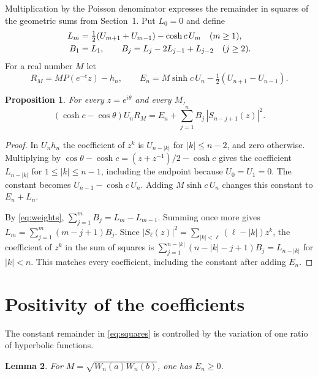 \documentclass[10pt,twoside,reqno]{amsart}
\newtheorem{proposition}{Proposition}[section]
\newtheorem{lemma}[proposition]{Lemma}
\numberwithin{equation}{section}
\begin{document}
Multiplication by the Poisson denominator expresses the remainder in squares
of the geometric sums from Section~1. Put \(L_0=0\) and define
\begin{align}
 L_m&=\tfrac12(U_{m+1}+U_{m-1})-\cosh c\,U_m \quad (m\ge1), \notag\\
 B_1&=L_1,\qquad B_j=L_j-2L_{j-1}+L_{j-2}\quad (j\ge2). \label{eq:weights}
\end{align}
For a real number \(M\) let
\[
 R_M=M P(e^{-c}z)-h_n,\qquad
 E_n=M\sinh c\,U_n-\tfrac12(U_{n+1}-U_{n-1}).
\]

\begin{proposition}\label{prop:squares}
For every \(z=e^{i\theta}\) and every \(M\),
\begin{equation}\tag{A}\label{eq:squares}
 (\cosh c-\cos\theta)U_n R_M
   =E_n+\sum_{j=1}^n B_j\,|S_{n-j+1}(z)|^2 .
\end{equation}
\end{proposition}

\begin{proof}
In \(U_n h_n\) the coefficient of \(z^k\) is \(U_{n-|k|}\) for
\(|k|\le n-2\), and zero otherwise. Multiplying by
\(\cos\theta-\cosh c=(z+z^{-1})/2-\cosh c\) gives the coefficient
\(L_{n-|k|}\) for \(1\le|k|\le n-1\), including the endpoint because
\(U_0=U_1=0\). The constant becomes \(U_{n-1}-\cosh c\,U_n\).
Adding \(M\sinh c\,U_n\) changes this constant to \(E_n+L_n\).

By \eqref{eq:weights}, \(\sum_{j=1}^m B_j=L_m-L_{m-1}\).
Summing once more gives
\(L_m=\sum_{j=1}^m(m-j+1)B_j\). Since
\(|S_\ell(z)|^2=\sum_{|k|<\ell}(\ell-|k|)z^k\),
the coefficient of \(z^k\) in the sum of squares is
\(\sum_{j=1}^{n-|k|}(n-|k|-j+1)B_j=L_{n-|k|}\) for \(|k|<n\).
This matches every coefficient, including the constant after adding \(E_n\).
\end{proof}

\section{Positivity of the coefficients}

The constant remainder in \eqref{eq:squares} is controlled by the
variation of one ratio of hyperbolic functions.

\begin{lemma}\label{lem:remainder}
For \(M=\sqrt{W_n(a)W_n(b)}\), one has \(E_n\ge0\).
\end{lemma}
\end{document}
